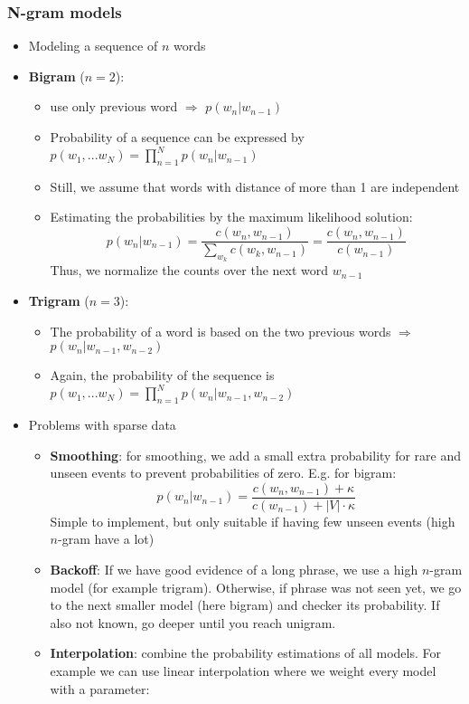 \subsubsection{N-gram models}
\begin{itemize}
	\item Modeling a sequence of $n$ words
	\item \textbf{Bigram} ($n=2$): 
	\begin{itemize}
		\item use only previous word $\Rightarrow$ $p(w_n|w_{n-1})$
		\item Probability of a sequence can be expressed by $p(w_1,...w_N)=\prod\limits_{n=1}^{N} p(w_n|w_{n-1})$
		\item Still, we assume that words with distance of more than 1 are independent
		\item Estimating the probabilities by the maximum likelihood solution: $$p(w_n|w_{n-1})=\frac{c(w_n, w_{n-1})}{\sum_{w_k} c(w_k, w_{n-1})}=\frac{c(w_n, w_{n-1})}{c(w_{n-1})}$$
		Thus, we normalize the counts over the next word $w_{n-1}$
	\end{itemize}
	\item \textbf{Trigram} ($n=3$):
	\begin{itemize}
		\item The probability of a word is based on the two previous words $\Rightarrow$ $p(w_n|w_{n-1},w_{n-2})$
		\item Again, the probability of the sequence is $p(w_1,...w_N)=\prod\limits_{n=1}^{N} p(w_n|w_{n-1},w_{n-2})$
	\end{itemize}
	\item Problems with sparse data
	\begin{itemize}
		\item \textbf{Smoothing}: for smoothing, we add a small extra probability for rare and unseen events to prevent probabilities of zero. E.g. for bigram:
		$$p(w_n|w_{n-1})=\frac{c(w_n, w_{n-1}) + \kappa}{c(w_{n-1}) + |V|\cdot \kappa }$$
		Simple to implement, but only suitable if having few unseen events (high $n$-gram have a lot)
		\item \textbf{Backoff}: If we have good evidence of a long phrase, we use a high $n$-gram model (for example trigram). Otherwise, if phrase was not seen yet, we go to the next smaller model (here bigram) and checker its probability. If also not known, go deeper until you reach unigram.
		\item \textbf{Interpolation}: combine the probability estimations of all models. For example we can use linear interpolation where we weight every model with a parameter:

\end{itemize}
\end{itemize}
